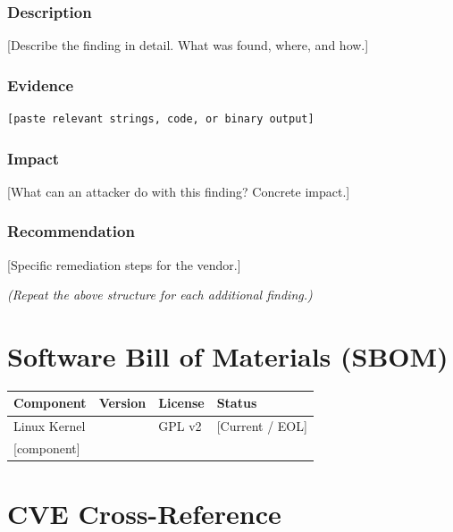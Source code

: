 \documentclass[12pt,a4paper]{article}
\begin{document}
\subsubsection*{Description}
[Describe the finding in detail. What was found, where, and how.]

\subsubsection*{Evidence}
\begin{lstlisting}
[paste relevant strings, code, or binary output]
\end{lstlisting}

\subsubsection*{Impact}
[What can an attacker do with this finding? Concrete impact.]

\subsubsection*{Recommendation}
[Specific remediation steps for the vendor.]

\bigskip
\textit{(Repeat the above structure for each additional finding.)}

\section{Software Bill of Materials (SBOM)}\label{sec:sbom}

\begin{tabularx}{\linewidth}{lllX}
  \toprule
  \rowcolor{tabhead}
  \textcolor{tabheadtext}{\textbf{Component}} &
  \textcolor{tabheadtext}{\textbf{Version}} &
  \textcolor{tabheadtext}{\textbf{License}} &
  \textcolor{tabheadtext}{\textbf{Status}} \\
  \midrule
  Linux Kernel & & GPL v2 & [Current / EOL] \\
  \rowcolor{rowalt}
  {[component]} & & & \\
  \bottomrule
\end{tabularx}

\section{CVE Cross-Reference}\label{sec:cve}
\end{document}
